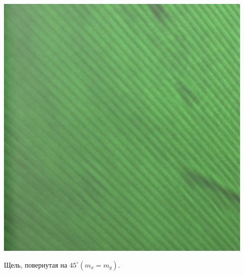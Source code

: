 \begin{minipage}{0.40\textwidth}
\begin{center}
\includegraphics[width = 0.95\textwidth]{images/6.jpg}
\end{center}

\begin{center}
Щель, повернутая на $45^{\circ}\left(m_{x}=m_{y}\right)$. 
\end{center}
\end{minipage}
 
